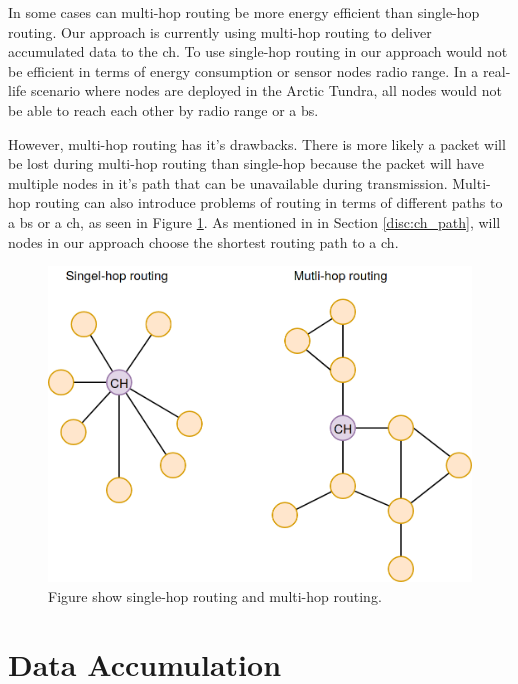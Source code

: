 \documentclass[USenglish]{uit-thesis}
\begin{document}
In some cases can multi-hop routing be more energy efficient than single-hop routing\cite{hopping2}. Our approach is currently using multi-hop routing to deliver accumulated data to the \gls{ch}. To use single-hop routing in our approach would not be efficient in terms of energy consumption or sensor nodes radio range. In a real-life scenario where nodes are deployed in the Arctic Tundra, all nodes would not be able to reach each other by radio range or a \gls{bs}.

However, multi-hop routing has it's drawbacks. There is more likely a packet will be lost during multi-hop routing than single-hop because the packet will have multiple nodes in it's path that can be unavailable during transmission. Multi-hop routing can also introduce problems of routing in terms of different paths to a \gls{bs} or a \gls{ch}, as seen in Figure \ref{fig:hopping}. As mentioned in in Section \ref{disc:ch_path}, will nodes in our approach choose the shortest routing path to a \gls{ch}.


\begin{figure} [ht]
\centering
\includegraphics[scale=0.35]{hopping.png}
\caption{Figure show single-hop routing and multi-hop routing.}
\label{fig:hopping}
\end{figure}


\section{Data Accumulation} \label{disc:data_acc}
\end{document}
